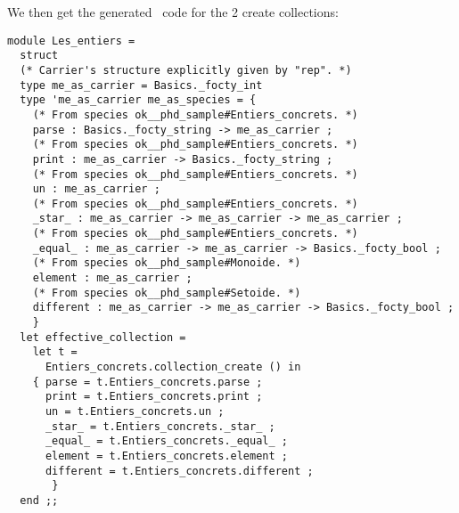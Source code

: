 We then get the generated \ocaml\ code for the 2 create collections:
{\footnotesize
\begin{lstlisting}[language=MyOCaml, title=\ocaml\ code for collections]
module Les_entiers =
  struct
  (* Carrier's structure explicitly given by "rep". *)
  type me_as_carrier = Basics._focty_int
  type 'me_as_carrier me_as_species = {
    (* From species ok__phd_sample#Entiers_concrets. *)
    parse : Basics._focty_string -> me_as_carrier ;
    (* From species ok__phd_sample#Entiers_concrets. *)
    print : me_as_carrier -> Basics._focty_string ;
    (* From species ok__phd_sample#Entiers_concrets. *)
    un : me_as_carrier ;
    (* From species ok__phd_sample#Entiers_concrets. *)
    _star_ : me_as_carrier -> me_as_carrier -> me_as_carrier ;
    (* From species ok__phd_sample#Entiers_concrets. *)
    _equal_ : me_as_carrier -> me_as_carrier -> Basics._focty_bool ;
    (* From species ok__phd_sample#Monoide. *)
    element : me_as_carrier ;
    (* From species ok__phd_sample#Setoide. *)
    different : me_as_carrier -> me_as_carrier -> Basics._focty_bool ;
    }
  let effective_collection =
    let t =
      Entiers_concrets.collection_create () in
    { parse = t.Entiers_concrets.parse ;
      print = t.Entiers_concrets.print ;
      un = t.Entiers_concrets.un ;
      _star_ = t.Entiers_concrets._star_ ;
      _equal_ = t.Entiers_concrets._equal_ ;
      element = t.Entiers_concrets.element ;
      different = t.Entiers_concrets.different ;
       }
  end ;;


\end{lstlisting}}
